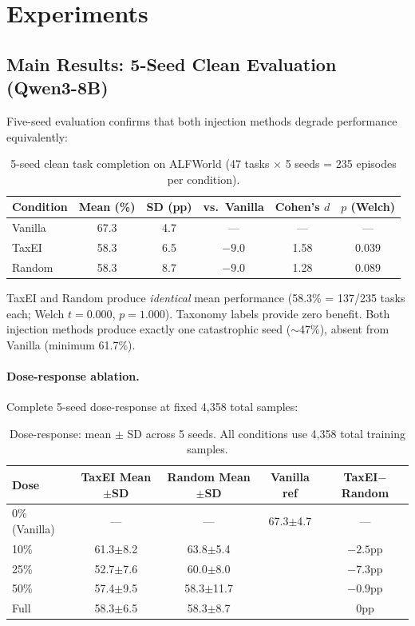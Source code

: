 \documentclass[11pt,a4paper]{article}
\begin{document}
\section{Experiments}

\subsection{Main Results: 5-Seed Clean Evaluation (Qwen3-8B)}

Five-seed evaluation confirms that both injection methods degrade performance equivalently:

\begin{table}[h]
\centering
\caption{5-seed clean task completion on ALFWorld (47 tasks $\times$ 5 seeds = 235 episodes per condition).}
\label{tab:main}
\begin{tabular}{lccccc}
\toprule
Condition & Mean (\%) & SD (pp) & vs.\ Vanilla & Cohen's $d$ & $p$ (Welch) \\
\midrule
Vanilla & 67.3 & 4.7 & --- & --- & --- \\
TaxEI & 58.3 & 6.5 & $-9.0$ & 1.58 & 0.039 \\
Random & 58.3 & 8.7 & $-9.0$ & 1.28 & 0.089 \\
\bottomrule
\end{tabular}
\end{table}

TaxEI and Random produce \emph{identical} mean performance (58.3\% = 137/235 tasks each; Welch $t=0.000$, $p=1.000$). Taxonomy labels provide zero benefit. Both injection methods produce exactly one catastrophic seed ($\sim$47\%), absent from Vanilla (minimum 61.7\%).

\paragraph{Dose-response ablation.} Complete 5-seed dose-response at fixed 4,358 total samples:

\begin{table}[h]
\centering
\caption{Dose-response: mean $\pm$ SD across 5 seeds. All conditions use 4,358 total training samples.}
\label{tab:dose}
\begin{tabular}{lcccc}
\toprule
Dose & TaxEI Mean$\pm$SD & Random Mean$\pm$SD & Vanilla ref & TaxEI$-$Random \\
\midrule
0\% (Vanilla) & --- & --- & 67.3$\pm$4.7 & --- \\
10\% & 61.3$\pm$8.2 & 63.8$\pm$5.4 & & $-2.5$pp \\
25\% & 52.7$\pm$7.6 & 60.0$\pm$8.0 & & $-7.3$pp \\
50\% & 57.4$\pm$9.5 & 58.3$\pm$11.7 & & $-0.9$pp \\
Full & 58.3$\pm$6.5 & 58.3$\pm$8.7 & & 0pp \\
\bottomrule
\end{tabular}
\end{table}
\end{document}
